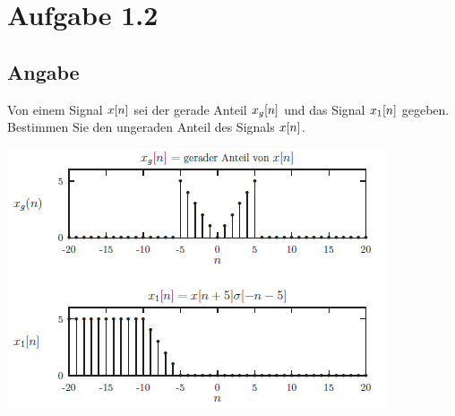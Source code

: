 \section*{Aufgabe 1.2}
\subsection*{Angabe}
	Von einem Signal $x\negthinspace\left[n\right]$ sei der gerade Anteil $x_g\negthinspace\left[n\right]$ und das Signal $x_1\negthinspace\left[n\right]$ gegeben. Bestimmen Sie den ungeraden Anteil des Signals $x\negthinspace\left[n\right]$.
	\begin{center}
		\includegraphics{1_2}
	\end{center}
